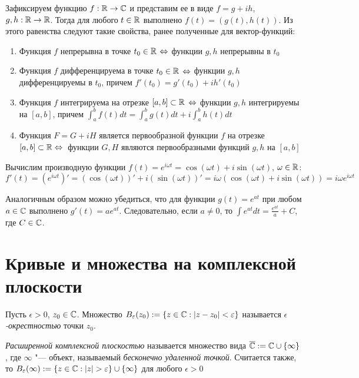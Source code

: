 \begin{note}
	Зафиксируем функцию $f : \mathbb{R} \to \mathbb{C}$ и представим ее в виде $f = g + ih$, $g, h : \mathbb{R} \to \mathbb{R}$. Тогда для любого $t \in \mathbb{R}$ выполнено $f(t) = (g(t), h(t))$. Из этого равенства следуют такие свойства, ранее полученные для вектор-функций:
	\begin{enumerate}
		\item Функция $f$ непрерывна в точке $t_0 \in \mathbb{R}$ $\Leftrightarrow$ функции $g, h$ непрерывны в $t_0$
		\item Функция $f$ дифференцируема в точке $t_0 \in \mathbb{R}$ $\Leftrightarrow$ функции $g, h$ дифференцируемы в $t_0$, причем $f'(t_0) = g'(t_0) + ih'(t_0)$
		\item Функция $f$ интегрируема на отрезке $[a, b] \subset \mathbb{R}$ $\Leftrightarrow$ функции $g, h$ интегрируемы на $[a, b]$, причем $\int_a^bf(t)dt = \int_a^bg(t)dt + i\int_a^bh(t)dt$
		\item Функция $F = G + iH$ является первообразной функции $f$ на отрезке $[a, b] \subset \R \hm\lra$~функции $G, H$ являются первообразными функций $g, h$ на $[a, b]$
	\end{enumerate}
\end{note}

\begin{example}
	Вычислим производную функции $f(t) = e^{i\omega t} = \cos(\omega t) + i\sin(\omega t)$, $\omega \in \mathbb{R}$:
	\[f'(t) = \left(e^{i\omega t}\right)' = \left(\cos(\omega t)\right)' + i \left(\sin(\omega t)\right)' = i\omega(\cos(\omega t) + i\sin(\omega t)) = i\omega e^{i \omega t}\]
	
	Аналогичным образом можно убедиться, что для функции $g(t) = e^{at}$ при любом $a \in \mathbb{C}$ выполнено $g'(t) = ae^{at}$. Следовательно, если $a \ne 0$, то $\int e^{at}dt = \frac{e^{at}}{a} + C$, где $C \in \mathbb{C}$.
\end{example}

\section{Кривые и множества на комплексной плоскости}

\begin{definition}
	Пусть $\epsilon > 0$, $z_0 \in \mathbb{C}$. Множество $B_{\varepsilon}(z_0) := \{z \in \mathbb{C}: |z - z_0| < \varepsilon\}$ называется \textit{$\epsilon$-окрестностью} точки $z_0$.
\end{definition}

\begin{definition}
	\textit{Расширенной комплексной плоскостью} называется множество вида $\overline{\mathbb{C}} := \mathbb{C} \cup \{\infty\}$, где $\infty$ "--- объект, называемый \textit{бесконечно удаленной точкой}. Считается также, то $B_{\varepsilon}(\infty) := \{z \in \mathbb{C}: |z| > \varepsilon\} \cup \{\infty\}$ для любого $\epsilon > 0$
\end{definition}


